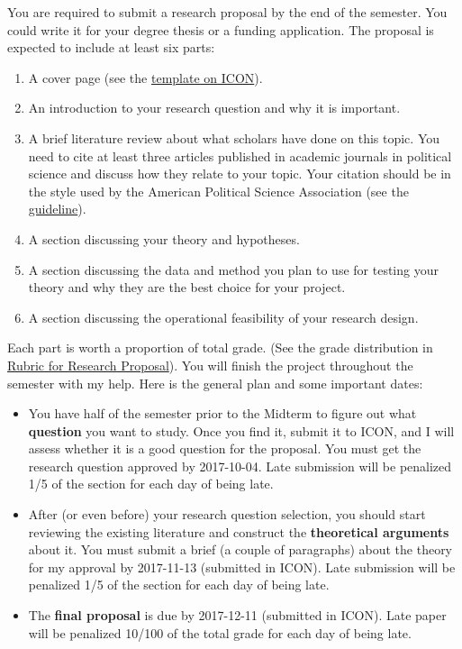 \documentclass[11pt,]{article}
\providecommand{\tightlist}{%
  \setlength{\itemsep}{0pt}\setlength{\parskip}{0pt}}
\theoremstyle{definition}
\theoremstyle{definition}
\theoremstyle{definition}
\theoremstyle{remark}
\begin{document}
You are required to submit a research proposal by the end of the
semester. You could write it for your degree thesis or a funding
application. The proposal is expected to include at least six parts:

\begin{enumerate}
\def\labelenumi{\arabic{enumi}.}
\tightlist
\item
  A cover page (see the
  \href{https://uiowa.instructure.com/courses/65855/files/4424694?module_item_id=1468917}{template
  on ICON}).
\item
  An introduction to your research question and why it is important.
\item
  A brief literature review about what scholars have done on this topic.
  You need to cite at least three articles published in academic
  journals in political science and discuss how they relate to your
  topic. Your citation should be in the style used by the American
  Political Science Association (see the
  \href{http://www.apsanet.org/portals/54/Files/Publications/APSAStyleManual2006.pdf}{guideline}).
\item
  A section discussing your theory and hypotheses.
\item
  A section discussing the data and method you plan to use for testing
  your theory and why they are the best choice for your project.
\item
  A section discussing the operational feasibility of your research
  design.
\end{enumerate}

Each part is worth a proportion of total grade. (See the grade
distribution in \protect\hyperlink{id}{Rubric for Research Proposal}).
You will finish the project throughout the semester with my help. Here
is the general plan and some important dates:

\begin{itemize}
\tightlist
\item
  You have half of the semester prior to the Midterm to figure out what
  \textbf{question} you want to study. Once you find it, submit it to
  ICON, and I will assess whether it is a good question for the
  proposal. You must get the research question approved by 2017-10-04.
  Late submission will be penalized 1/5 of the section for each day of
  being late.
\item
  After (or even before) your research question selection, you should
  start reviewing the existing literature and construct the
  \textbf{theoretical arguments} about it. You must submit a brief (a
  couple of paragraphs) about the theory for my approval by 2017-11-13
  (submitted in ICON). Late submission will be penalized 1/5 of the
  section for each day of being late.
\item
  The \textbf{final proposal} is due by 2017-12-11 (submitted in ICON).
  Late paper will be penalized 10/100 of the total grade for each day of
  being late.
\end{itemize}
\end{document}
